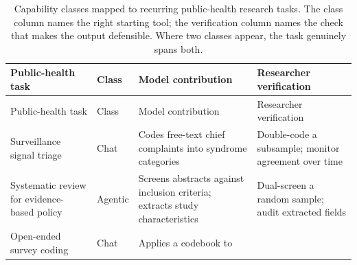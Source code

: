 \documentclass[
  letterpaper,
  11pt]{scrbook}
\begin{document}
\begin{longtable}[]{@{}
  >{\raggedright\arraybackslash}p{}
  >{\raggedright\arraybackslash}p{}
  >{\raggedright\arraybackslash}p{}
  >{\raggedright\arraybackslash}p{}@{}}
\caption{Capability classes mapped to recurring public-health research
tasks. The class column names the right starting tool; the verification
column names the check that makes the output defensible. Where two
classes appear, the task genuinely spans
both.}\label{tbl-ph-class-tasks}\tabularnewline
\toprule\noalign{}
\begin{minipage}[b]{\linewidth}\raggedright
Public-health task
\end{minipage} & \begin{minipage}[b]{\linewidth}\raggedright
Class
\end{minipage} & \begin{minipage}[b]{\linewidth}\raggedright
Model contribution
\end{minipage} & \begin{minipage}[b]{\linewidth}\raggedright
Researcher verification
\end{minipage} \\
\midrule\noalign{}
\endfirsthead
\toprule\noalign{}
\begin{minipage}[b]{\linewidth}\raggedright
Public-health task
\end{minipage} & \begin{minipage}[b]{\linewidth}\raggedright
Class
\end{minipage} & \begin{minipage}[b]{\linewidth}\raggedright
Model contribution
\end{minipage} & \begin{minipage}[b]{\linewidth}\raggedright
Researcher verification
\end{minipage} \\
\midrule\noalign{}
\endhead
\bottomrule\noalign{}
\endlastfoot
Surveillance signal triage & Chat & Codes free-text chief complaints
into syndrome categories & Double-code a subsample; monitor agreement
over time \\
Systematic review for evidence-based policy & Agentic & Screens
abstracts against inclusion criteria; extracts study characteristics &
Dual-screen a random sample; audit extracted fields \\
Open-ended survey coding & Chat & Applies a codebook to

\end{longtable}
\end{document}

